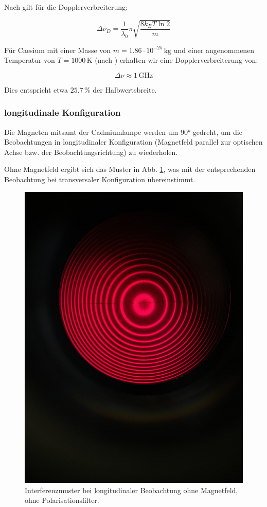 \documentclass{article}
\begin{document}
\begin{multicols}{2}
Nach \cite{} gilt für die Dopplerverbreiterung:

\[
\Delta \nu_D = \frac{1}{\lambda_0} \pi \sqrt{\frac{8 k_B T \ln 2}{m}}
\]

Für Caesium mit einer Masse von $m = 1.86 \cdot 10^{-25} \, \text{kg}$ und einer angenommenen Temperatur von $T = 1000 \, \text{K}$ (nach \cite{source11}) erhalten wir eine Dopplerverbreiterung von:

\[
\Delta \nu \approx 1 \, \text{GHz}
\]

Dies entspricht etwa $25.7 \, \%$ der Halbwertsbreite.

\subsubsection{longitudinale Konfiguration}
Die Magneten mitsamt der Cadmiumlampe werden um \ang{90} gedreht,
um die Beobachtungen in longitudinaler Konfiguration (Magnetfeld parallel zur optischen Achse bzw. der Beobachtungsrichtung)
zu wiederholen.

Ohne Magnetfeld ergibt sich das Muster in Abb. \ref{fig:zeeman-longitudinal-ohne-ohne}, was mit der entsprechenden Beobachtung
bei transversaler Konfiguration übereinstimmt.
\begin{figure}[H]
  \centering
  \includegraphics[width=.8\linewidth]{zeeman-longitudinal-ohne-ohne}
  \caption{Interferenzmuster bei longitudinaler Beobachtung ohne Magnetfeld, ohne Polarisationsfilter.}
  \label{fig:zeeman-longitudinal-ohne-ohne}
\end{figure}


\end{multicols}
\end{document}
